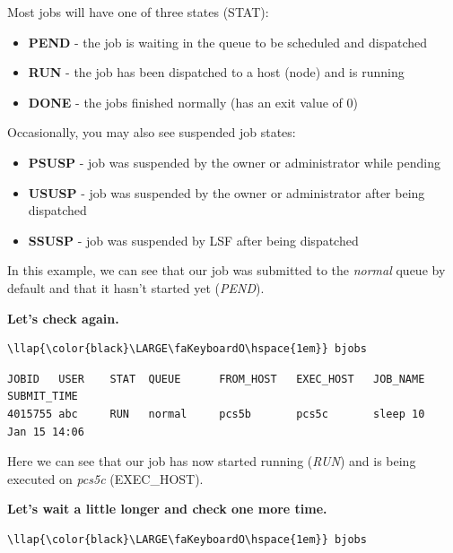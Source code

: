 \documentclass[11pt]{article}
\providecommand{\tightlist}{%
      \setlength{\itemsep}{0pt}\setlength{\parskip}{0pt}}
\begin{document}
    Most jobs will have one of three states (STAT):

\begin{itemize}
\tightlist
\item
  \textbf{PEND} - the job is waiting in the queue to be scheduled and
  dispatched
\item
  \textbf{RUN} - the job has been dispatched to a host (node) and is
  running
\item
  \textbf{DONE} - the jobs finished normally (has an exit value of 0)
\end{itemize}

\newpage

Occasionally, you may also see suspended job states:

\begin{itemize}
\tightlist
\item
  \textbf{PSUSP} - job was suspended by the owner or administrator while
  pending
\item
  \textbf{USUSP} - job was suspended by the owner or administrator after
  being dispatched
\item
  \textbf{SSUSP} - job was suspended by LSF after being dispatched
\end{itemize}

    In this example, we can see that our job was submitted to the
\textit{normal} queue by default and that it hasn't started yet
(\textit{PEND}).

\textbf{Let's check again.}

\begin{terminalinput}
\begin{Verbatim}[commandchars=\\\{\}]
\llap{\color{black}\LARGE\faKeyboardO\hspace{1em}} bjobs
\end{Verbatim}
\end{terminalinput}


    \begin{verbatim}
JOBID   USER    STAT  QUEUE      FROM_HOST   EXEC_HOST   JOB_NAME   SUBMIT_TIME
4015755 abc     RUN   normal     pcs5b       pcs5c       sleep 10   Jan 15 14:06
\end{verbatim}

    Here we can see that our job has now started running (\textit{RUN}) and is
being executed on \textit{pcs5c} (EXEC\_HOST).

\textbf{Let's wait a little longer and check one more time.}

\begin{terminalinput}
\begin{Verbatim}[commandchars=\\\{\}]
\llap{\color{black}\LARGE\faKeyboardO\hspace{1em}} bjobs
\end{Verbatim}
\end{terminalinput}
\end{document}
